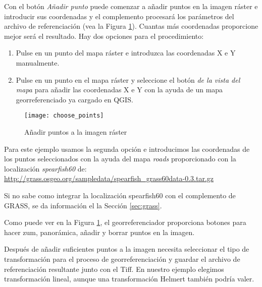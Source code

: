Con el botón \textsl{Añadir punto} puede comenzar a añadir puntos en la
imagen ráster e introducir sus coordenadas y el complemento procesará los 
parámetros del archivo de referenciación (vea la Figura \ref{fig:choose_points}). Cuantas más 
coordenadas proporcione mejor será el resultado. Hay dos opciones para el procedimiento:

\begin{enumerate}
\item Pulse en un punto del mapa ráster e introduzca las coordenadas X e Y manualmente.
\item Pulse en un punto en el mapa ráster y seleccione el botón
\textsl{de la vista del mapa} para añadir las coordenadas X e Y con la ayuda de un mapa georreferenciado ya cargado en QGIS.
\end{enumerate}

\begin{figure}[ht]
\begin{center}
  \caption{Añadir puntos a la imagen ráster}\label{fig:choose_points}\smallskip
  \texttt{[image: choose\_points]}
\end{center}
\end{figure}

Para este ejemplo usamos la segunda opción e introducimos las coordenadas de los
puntos seleccionados con la ayuda del mapa \textsl{roads} proporcionado con la 
localización \textsl{spearfish60} de: \\
\url{http://grass.osgeo.org/sampledata/spearfish\_grass60data-0.3.tar.gz}

Si no sabe como integrar la localización spearfish60 con el complemento de GRASS, se da información el la Sección \ref{sec:grass}. 

Como puede ver en la Figura \ref{fig:choose_points}, el georreferenciador proporciona botones 
para hacer zum, panorámica, añadir y borrar puntos en la imagen.

Después de añadir suficientes puntos a la imagen necesita seleccionar el tipo de transformación 
para el proceso de georreferenciación y guardar el archivo de referenciación resultante junto con el 
Tiff. En nuestro ejemplo elegimos transformación lineal, aunque una transformación Helmert también podría valer.

\begin{Tip}\caption{\textsc{Seleccionar el tipo de transformación}}
\end{Tip} 

